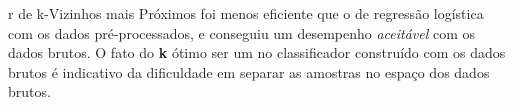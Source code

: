 \documentclass[final,5p]{elsarticle}
\numberwithin{equation}{section}
\begin{document}
r de k-Vizinhos mais Próximos foi menos eficiente que o de regressão logística com os dados pré-processados, e conseguiu um desempenho \emph{aceitável} com os dados brutos. O fato do \textbf{k} ótimo ser um no classificador construído com os dados brutos é indicativo da dificuldade em separar as amostras no espaço dos dados brutos.














\end{document}
